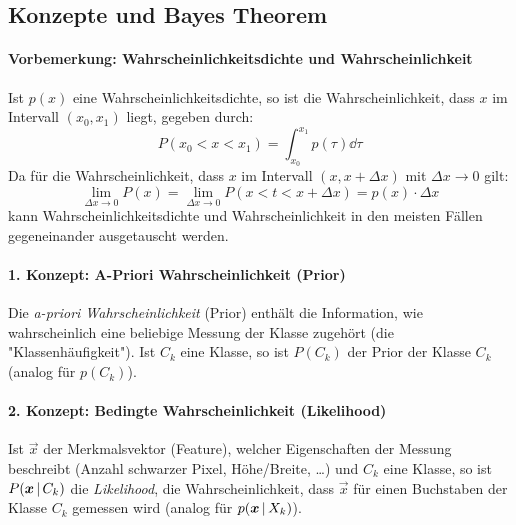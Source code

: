 		\subsection{Konzepte und Bayes Theorem}
			\paragraph{Vorbemerkung: Wahrscheinlichkeitsdichte und Wahrscheinlichkeit}
				Ist \( p(x) \) eine Wahrscheinlichkeitsdichte, so ist die Wahrscheinlichkeit, dass \(x\) im Intervall \( (x_0, x_1) \) liegt, gegeben durch:
				\begin{equation*}
					P(x_0 < x < x_1) = \int_{x_0}^{x_1} \! p(\tau) \dd{\tau}
				\end{equation*}
				Da für die Wahrscheinlichkeit, dass \( x \) im Intervall \( (x, x + \Delta x) \) mit \( \Delta x \to 0 \) gilt:
				\begin{equation*}
					\lim\limits_{\Delta x \to 0} P(x) = \lim\limits_{\Delta x \to 0} P(x < t < x + \Delta x) = p(x) \cdot \Delta x
				\end{equation*}
				kann Wahrscheinlichkeitsdichte und Wahrscheinlichkeit in den meisten Fällen gegeneinander ausgetauscht werden.
		
			\paragraph{1. Konzept: A-Priori Wahrscheinlichkeit (Prior)}
				Die \emph{a-priori Wahrscheinlichkeit} (Prior) enthält die Information, wie wahrscheinlich eine beliebige Messung der Klasse zugehört (\dh die "Klassenhäufigkeit"). Ist \( C_k \) eine Klasse, so ist \( P(C_k) \) der Prior \bzgl der Klasse \( C_k \) (analog für \( p(C_k) \)).
			
			\paragraph{2. Konzept: Bedingte Wahrscheinlichkeit (Likelihood)}
				Ist \(\vec{x}\) der Merkmalsvektor (Feature), welcher Eigenschaften der Messung beschreibt (Anzahl schwarzer Pixel, Höhe/Breite, \dots) und \( C_k \) eine Klasse, so ist \( P(\bm{x} \,\vert\, C_k) \) die \emph{Likelihood}, \dh die Wahrscheinlichkeit, dass \(\vec{x}\) für einen Buchstaben der Klasse \( C_k \) gemessen wird (analog für \( p(\bm{x} \,\vert\, X_k) \)).
			

